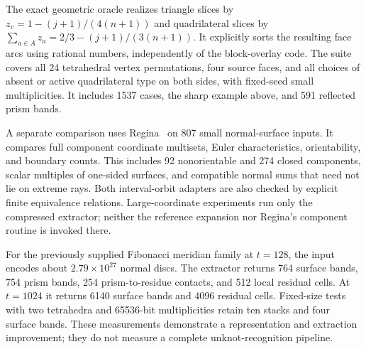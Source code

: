 The exact geometric oracle realizes triangle slices by
$z_v=1-(j+1)/(4(n+1))$ and quadrilateral slices by
$\sum_{a\in A}z_a=2/3-(j+1)/(3(n+1))$. It explicitly sorts the resulting
face arcs using rational numbers, independently of the block-overlay code.
The suite covers all 24 tetrahedral vertex permutations, four source faces,
and all choices of absent or active quadrilateral type on both sides,
with fixed-seed small multiplicities. It includes 1537 cases, the sharp
example above, and 591 reflected prism bands.

A separate comparison uses Regina~\cite{regina} on 807 small normal-surface inputs.
It compares full component coordinate multisets, Euler characteristics,
orientability, and boundary counts. This includes 92 nonorientable and
274 closed components, scalar multiples of one-sided surfaces, and compatible
normal sums that need not lie on extreme rays. Both interval-orbit adapters
are also checked by explicit finite equivalence relations. Large-coordinate
experiments run only the compressed extractor; neither the reference
expansion nor Regina's component routine is invoked there.

For the previously supplied Fibonacci meridian family at $t=128$, the
input encodes about $2.79\times10^{27}$ normal discs. The extractor returns
764 surface bands, 754 prism bands, 254 prism-to-residue contacts, and
512 local residual cells. At $t=1024$ it returns 6140 surface bands
and 4096 residual cells. Fixed-size tests with two tetrahedra and
65536-bit multiplicities retain ten stacks and four surface bands.
These measurements demonstrate a representation and extraction improvement;
they do not measure a complete unknot-recognition pipeline.
